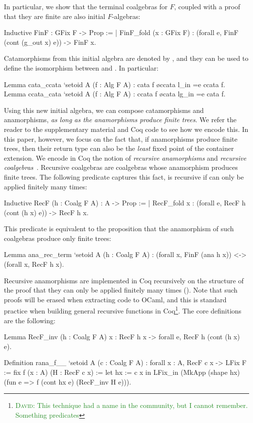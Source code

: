 \documentclass[anonymous, a4paper, UKenglish, cleveref, autoref, thm-restate]{lipics-v2021}
\newcommand{\dcas}[1]{\textcolor{ForestGreen}{\textsc{David}: #1}}
\begin{document}
In particular, we show that the terminal coalgebras
for $F$, coupled with a proof that they are finite are also initial
$F$-algebras:
\begin{coqcode}
Inductive FinF : GFix F -> Prop :=
| FinF_fold (x : GFix F) : (forall e, FinF (cont (g_out x) e)) -> FinF x.
\end{coqcode}
Catamorphisms from this initial algebra are denoted by ,
and they can be used to define the isomorphism between
 and
. In particular:
\begin{coqcode}
Lemma cata_ccata `{setoid A} (f : Alg F A) : cata f \o ccata l_in =e ccata f.
Lemma ccata_cata `{setoid A} (f : Alg F A) : ccata f \o cata lg_in =e cata f.
\end{coqcode}
Using this new initial algebra, we can compose catamorphisms and anamorphisms,
\emph{as long as the anamorphisms produce finite trees}. We refer the reader to
the supplementary material and Coq code to see how we encode this. In this
paper, however, we focus on the fact that, if anamorphisms produce finite
trees, then their return type can also be the \emph{least} fixed point of the
container extension. We encode in Coq the notion of \emph{recursive
anamorphisms} and \emph{recursive coalgebras}~\cite{AdamekMM19,CaprettaUV04}.  Recursive
coalgebras are coalgebras whose anamorphism produces finite trees.  The
following predicate captures this fact,  is recursive if
 can only be applied finitely many times:
\begin{coqcode}
Inductive RecF (h : Coalg F A) : A -> Prop :=
| RecF_fold x : (forall e, RecF h (cont (h x) e)) -> RecF h x.
\end{coqcode}
This predicate is equivalent to the proposition that the anamorphism of such
coalgebras produce only finite trees:
\begin{coqcode}
Lemma ana_rec_term `{setoid A} (h : Coalg F A)
  : (forall x, FinF (ana h x)) <-> (forall x, RecF h x).
\end{coqcode}
Recursive anamorphisms are implemented in Coq recursively on the structure of
the proof that they can only be applied finitely many times ().  Note
that such proofs will be erased when extracting code to OCaml, and this is
standard practice when building general recursive functions in
Coq\footnote{\dcas{This technique had a name in the community, but I cannot
remember. Something predicates}}. The core definitions are the following:
\begin{coqcode}
Lemma RecF_inv (h : Coalg F A) x : RecF h x -> forall e, RecF h (cont (h x) e).

Definition rana_f__ `{setoid A} (c : Coalg F A)
  : forall x : A, RecF c x -> LFix F
  := fix f (x : A) (H : RecF c x) :=
       let hx := c x in
       LFix_in (MkApp (shape hx) (fun e => f (cont hx e) (RecF_inv H e))).
\end{coqcode}
\end{document}
